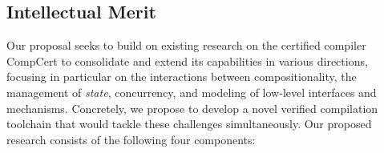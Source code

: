 \subsection{Intellectual Merit}
\label{ssec:intro-itm}

Our proposal seeks to build on existing research
on the certified compiler CompCert
to consolidate and extend its capabilities in various directions,
focusing in particular on the interactions between
compositionality,
the management of \emph{state},
concurrency, and
modeling of low-level interfaces and mechanisms.
%
%
Concretely,
we propose to develop a novel verified compilation
toolchain that would tackle these challenges simultaneously. Our
proposed research consists of the following four components:
